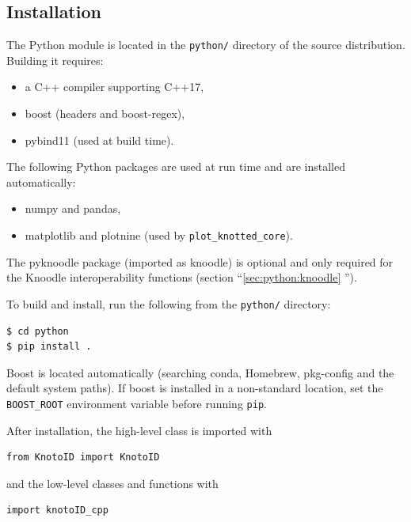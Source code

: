 \subsection{Installation}
The Python module is located in the \lstinline{python/} directory of the source distribution. Building it requires:
\begin{itemize}
\item a C++ compiler supporting C++17,
\item boost (headers and boost-regex),
\item {\ttfamily pybind11} (used at build time).
\end{itemize}
The following Python packages are used at run time and are installed automatically:
\begin{itemize}
\item {\ttfamily numpy} and {\ttfamily pandas},
\item {\ttfamily matplotlib} and {\ttfamily plotnine} (used by \lstinline{plot_knotted_core}).
\end{itemize}
The {\ttfamily pyknoodle} package (imported as {\ttfamily knoodle}) is optional and only required for the Knoodle interoperability functions (section ``\ref{sec:python:knoodle} '').

To build and install, run the following from the \lstinline{python/} directory:
\begin{lstlisting}
$ cd python
$ pip install .
\end{lstlisting}
Boost is located automatically (searching conda, Homebrew, pkg-config and the default system paths). If boost is installed in a non-standard location, set the \lstinline{BOOST_ROOT} environment variable before running \lstinline{pip}.

After installation, the high-level class is imported with
\begin{lstlisting}
from KnotoID import KnotoID
\end{lstlisting}
and the low-level classes and functions with
\begin{lstlisting}
import knotoID_cpp
\end{lstlisting}

